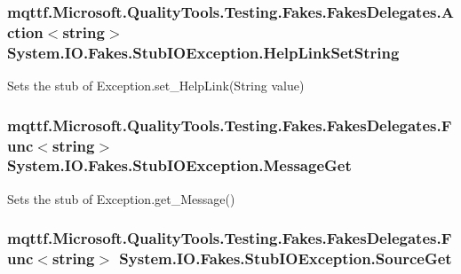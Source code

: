 \hypertarget{class_system_1_1_i_o_1_1_fakes_1_1_stub_i_o_exception_a86f69613c99c1a3c7838b7c8b5a52b61}{
\subsubsection[{Help\-Link\-Set\-String}]{\setlength{\rightskip}{0pt plus 5cm}mqttf.\-Microsoft.\-Quality\-Tools.\-Testing.\-Fakes.\-Fakes\-Delegates.\-Action$<$string$>$ System.\-I\-O.\-Fakes.\-Stub\-I\-O\-Exception.\-Help\-Link\-Set\-String}}\label{class_system_1_1_i_o_1_1_fakes_1_1_stub_i_o_exception_a86f69613c99c1a3c7838b7c8b5a52b61}


Sets the stub of Exception.\-set\-\_\-\-Help\-Link(\-String value)

\hypertarget{class_system_1_1_i_o_1_1_fakes_1_1_stub_i_o_exception_a749b0ad5487c501144faec7071361321}{
\subsubsection[{Message\-Get}]{\setlength{\rightskip}{0pt plus 5cm}mqttf.\-Microsoft.\-Quality\-Tools.\-Testing.\-Fakes.\-Fakes\-Delegates.\-Func$<$string$>$ System.\-I\-O.\-Fakes.\-Stub\-I\-O\-Exception.\-Message\-Get}}\label{class_system_1_1_i_o_1_1_fakes_1_1_stub_i_o_exception_a749b0ad5487c501144faec7071361321}


Sets the stub of Exception.\-get\-\_\-\-Message()

\hypertarget{class_system_1_1_i_o_1_1_fakes_1_1_stub_i_o_exception_aa1b4f0941a616785c0473498b7001399}{
\subsubsection[{Source\-Get}]{\setlength{\rightskip}{0pt plus 5cm}mqttf.\-Microsoft.\-Quality\-Tools.\-Testing.\-Fakes.\-Fakes\-Delegates.\-Func$<$string$>$ System.\-I\-O.\-Fakes.\-Stub\-I\-O\-Exception.\-Source\-Get}}\label{class_system_1_1_i_o_1_1_fakes_1_1_stub_i_o_exception_aa1b4f0941a616785c0473498b7001399}


